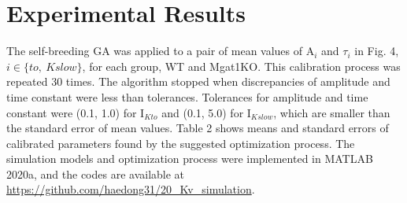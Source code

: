 \documentclass[journal]{IEEEtran}
\begin{document}
\section{Experimental Results}
\begin{table}
    \caption{Fitted model parameters}
    \label{table2}
    \centering
\end{table}
The self-breeding GA was applied to a pair of mean values of $\text{A}_i$ and $\tau_i$ in Fig. 4, $i \in \{to,\ Kslow\}$, for each group, WT and Mgat1KO. This calibration process was repeated 30 times. The algorithm stopped when discrepancies of amplitude and time constant were less than tolerances. Tolerances for amplitude and time constant were (0.1, 1.0) for $\text{I}_{Kto}$ and (0.1, 5.0) for $\text{I}_{Kslow}$, which are smaller than the standard error of mean values. Table 2 shows means and standard errors of calibrated parameters found by the suggested optimization process. The simulation models and optimization process were implemented in MATLAB 2020a, and the codes are available at \url{https://github.com/haedong31/20_Kv_simulation}.
\end{document}
